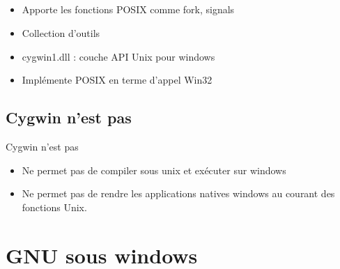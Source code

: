 \subsection{\subsectitle}
\begin{frame}{\sectitle}
    \begin{block}{\subsectitle}
        \begin{itemize}
            \item Apporte les fonctions POSIX comme fork, signals
            \item Collection d'outils
            \item cygwin1.dll : couche API Unix pour windows
            \item Implémente POSIX en terme d'appel Win32
        \end{itemize}
    \end{block}

\def\subsectitle{Cygwin n'est pas}
\subsection{\subsectitle}
    \begin{block}{\subsectitle}
        \begin{itemize}
            \item Ne permet pas de compiler sous unix et exécuter sur windows
            \item Ne permet pas de rendre les applications natives windows au
                courant des fonctions Unix.
        \end{itemize}
    \end{block}
\end{frame}


\def\sectitle{GNU sous windows}
\section{\sectitle}
\def\subsectitle{MinGW}
